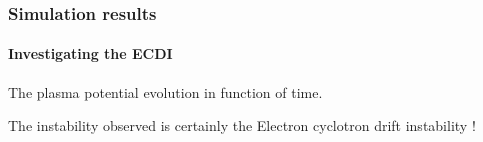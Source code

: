 \documentclass[sans, aspectratio=169]{beamer}
\begin{document}
\begin{frame}
\begin{columns}
\begin{column}{0.45\linewidth}
	\end{column}


\end{columns}		
	
	
\end{frame}

\begin{frame} 
	\frametitle{Simulation results} 
	\framesubtitle{ Investigating the ECDI } 

	\begin{center}
	The plasma potential evolution in function of time.\\
	
	
	The instability observed is certainly the Electron cyclotron drift instability !
	\end{center}
\end{frame}
\end{document}

